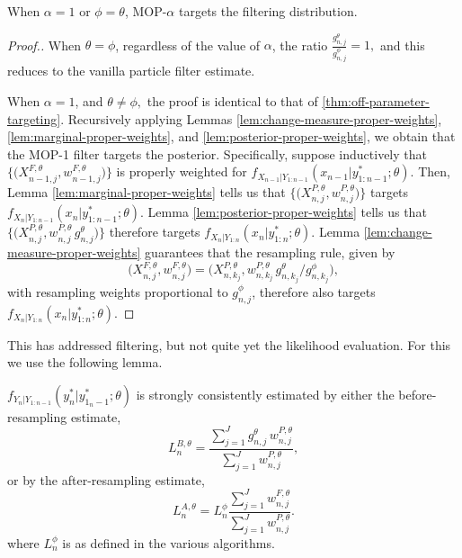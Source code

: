 \begin{prop}
    When $\alpha=1$ or $\phi=\theta$, MOP-$\alpha$ targets the filtering distribution. 
\end{prop}
\begin{proof}[Proof.]
    When $\theta=\phi$, regardless of the value of $\alpha$, the ratio $\frac{g_{n,j}^\theta}{g_{n,j}^\phi}=1,$ and this reduces to the vanilla particle filter estimate.

    When $\alpha=1$, and $\theta\neq\phi,$ the proof is identical to that of \ref{thm:off-parameter-targeting}. Recursively applying Lemmas \ref{lem:change-measure-proper-weights}, \ref{lem:marginal-proper-weights}, and \ref{lem:posterior-proper-weights}, we obtain that 
    the MOP-1 filter targets the posterior.
    Specifically, suppose inductively that $\big\{\big(X^{F,\theta}_{n-1,j},w^{F,\theta}_{n-1,j}\big)\big\}$ is properly weighted for $f_{X_{n-1}|Y_{1:n-1}}(x_{n-1}|y^*_{1:n-1};\theta)$.
    Then, Lemma \ref{lem:marginal-proper-weights} tells us that $\big\{\big(X^{P,\theta}_{n,j},w^{P,\theta}_{n,j}\big)\big\}$ targets $f_{X_{n}|Y_{1:n-1}}(x_{n}|y^*_{1:n-1};\theta)$.
    Lemma \ref{lem:posterior-proper-weights} tells us that $\big\{\big(X^{P,\theta}_{n,j},w^{P,\theta}_{n,j} \, g^\theta_{n,j} \big)\big\}$ therefore targets  $f_{X_{n}|Y_{1:n}}(x_{n}|y^*_{1:n};\theta)$.
    Lemma \ref{lem:change-measure-proper-weights} guarantees that the resampling rule, given by 
    \begin{equation}
    \big(X^{F,\theta}_{n,j},w^{F,\theta}_{n,j}\big) = \big(X^{P,\theta}_{n,k_j}, w^{P,\theta}_{n,k_j} \, g^\theta_{n,k_j}\big/ g^\phi_{n,k_j}\big),
    \end{equation}
    with resampling weights proportional to $g^\phi_{n,j}$, therefore also targets $f_{X_{n}|Y_{1:n}}(x_{n}|y^*_{1:n};\theta)$.
\end{proof}

This has addressed filtering, but not quite yet the likelihood evaluation. For this we use the following lemma.

\begin{lem}
    \label{lem:lik-proper-weight}
  $f_{Y_n|Y_{1:n-1}}(y_n^*|y_{1_n-1}^*;\theta)$ is strongly consistently estimated by either the before-resampling estimate,
\begin{equation}\label{L1}
L_n^{B,\theta} =  \frac{\sum_{j=1}^Jg^\theta_{n,j} \, w^{P,\theta}_{n,j}}{\sum_{j=1}^J  w^{P,\theta}_{n,j}},
\end{equation}
or by the after-resampling estimate,
\begin{equation}\label{L2}
L_n^{A,\theta} = L^\phi_n \frac{\sum_{j=1}^Jw^{F,\theta}_{n,j}}{\sum_{j=1}^J  w^{P,\theta}_{n,j}}.
\end{equation}
where $L^\phi_n$ is as defined in the various algorithms.
\end{lem}

